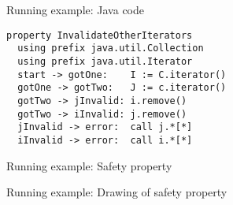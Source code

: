 \documentclass[preprint]{sigplanconf} %
\theoremstyle{definition}
\begin{document}
\begin{figure} %

\caption{Running example: Java code}
\label{fig:running.java}
\end{figure}
\begin{figure}
\begin{Verbatim}
property InvalidateOtherIterators
  using prefix java.util.Collection
  using prefix java.util.Iterator
  start -> gotOne:    I := C.iterator()
  gotOne -> gotTwo:   J := c.iterator()
  gotTwo -> jInvalid: i.remove()
  gotTwo -> iInvalid: j.remove()
  jInvalid -> error:  call j.*[*]
  iInvalid -> error:  call i.*[*]
\end{Verbatim}
\caption{Running example: Safety property}
\label{fig:running.property}
\end{figure}
\begin{figure}
\caption{Running example: Drawing of safety property}
\label{fig:running.drawing}
\end{figure}
\end{document}
